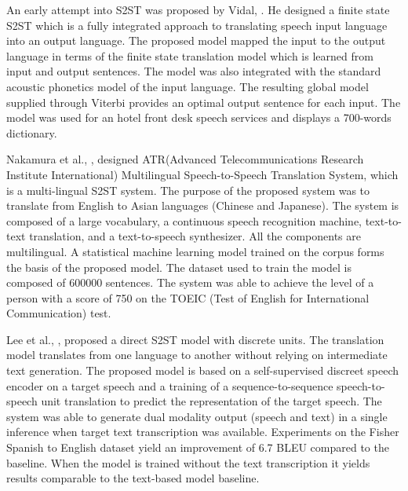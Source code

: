\documentclass[12pt]{article}
\begin{document}
An early attempt into S2ST was proposed by Vidal, \cite{vidal}. He designed a finite state S2ST which is a fully integrated approach to translating speech input language into an output language. The proposed model mapped the input to the output language in terms of the finite state translation model which is learned from input and output sentences. The model was also integrated with the standard acoustic phonetics model of the input language. The resulting global model supplied through Viterbi provides an optimal output sentence for each input. The model was used for an hotel front desk speech services and displays a 700-words dictionary.

Nakamura et al., \cite{nakamura}, designed ATR(Advanced Telecommunications Research Institute International) Multilingual Speech-to-Speech Translation System, which is a multi-lingual S2ST system. The purpose of the proposed system was to translate from English to Asian languages (Chinese and Japanese). The system is composed of a large vocabulary, a continuous speech recognition machine, text-to-text translation, and a text-to-speech synthesizer. All the components are multilingual. A statistical machine learning model trained on the corpus forms the basis of the proposed model. The dataset used to train the model is composed of 600000 sentences. The system was able to achieve the level of a person with a score of 750 on the TOEIC (Test of English for International Communication) test.

Lee et al., \cite{lee}, proposed a direct S2ST model with discrete units. The translation model translates from one language to another without relying on intermediate text generation. The proposed model is based on a self-supervised discreet speech encoder on a target speech and a training of a sequence-to-sequence speech-to-speech unit translation to predict the representation of the target speech. The system was able to generate dual modality output (speech and text) in a single inference when target text transcription was available. Experiments on the Fisher Spanish to English dataset yield an improvement of 6.7 BLEU compared to the baseline.
When the model is trained without the text transcription it yields results comparable to the text-based model baseline.



\end{document}

